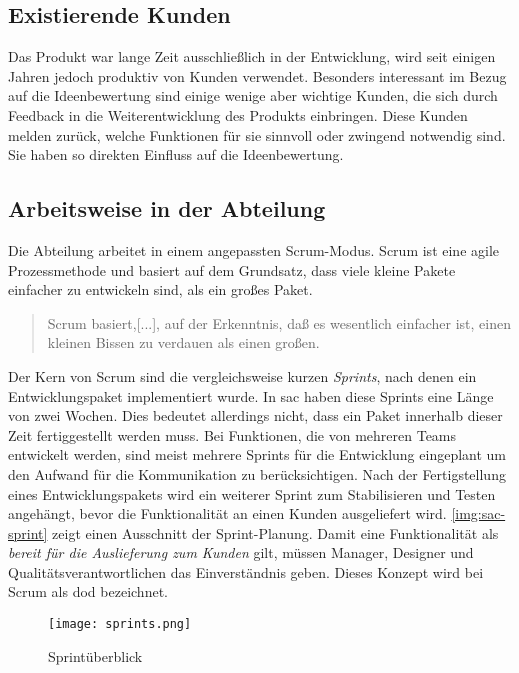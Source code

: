 \subsection{Existierende Kunden}
Das Produkt war lange Zeit ausschließlich in der Entwicklung, wird seit einigen Jahren jedoch produktiv von Kunden verwendet. Besonders 
interessant im Bezug auf die Ideenbewertung sind einige wenige aber wichtige Kunden, die sich durch Feedback in die 
Weiterentwicklung des Produkts einbringen. Diese Kunden melden zurück, welche Funktionen für sie sinnvoll oder 
zwingend notwendig sind. Sie haben so direkten Einfluss auf die Ideenbewertung. 

\subsection{Arbeitsweise in der Abteilung}
Die Abteilung arbeitet in einem angepassten Scrum-Modus. Scrum ist eine agile Prozessmethode und basiert 
auf dem Grundsatz, dass viele kleine Pakete einfacher zu entwickeln sind, als ein großes Paket. 
\begin{quote} Scrum basiert,[...], auf der Erkenntnis, daß es wesentlich einfacher ist, einen kleinen Bissen zu verdauen als einen großen.\cite{scrum:2018} \end{quote} 
Der Kern von Scrum sind die vergleichsweise kurzen \textit{Sprints}, nach denen ein Entwicklungspaket implementiert wurde. 
In \ac{sac} haben diese Sprints eine Länge von zwei Wochen. Dies bedeutet allerdings nicht, dass ein Paket 
innerhalb dieser Zeit fertiggestellt werden muss. 
Bei Funktionen, die von mehreren Teams entwickelt werden, sind meist mehrere Sprints für die Entwicklung eingeplant um den Aufwand für die Kommunikation zu berücksichtigen. 
Nach der Fertigstellung eines Entwicklungspakets wird ein weiterer Sprint zum Stabilisieren und Testen angehängt, bevor die Funktionalität an einen Kunden
ausgeliefert wird. \autoref{img:sac-sprint} zeigt einen Ausschnitt der Sprint-Planung.
Damit eine Funktionalität als \textit{bereit für die Auslieferung zum Kunden} gilt, müssen Manager, Designer und Qualitätsverantwortlichen das 
Einverständnis geben. Dieses Konzept wird bei Scrum als \ac{dod} bezeichnet. 
\begin{figure}[ht]
	\centering
	\texttt{[image: sprints.png]}
	\caption{Sprintüberblick}
	\label{img:sac-sprint}
\end{figure}



